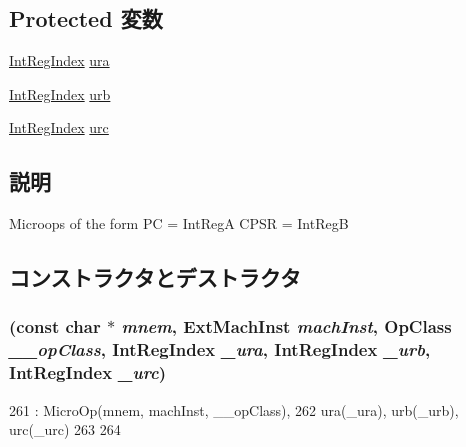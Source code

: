 \subsection*{Protected 変数}
\begin{DoxyCompactItemize}
\item 
\hyperlink{namespaceArmISA_ae64680ba9fb526106829d6bf92fc791b}{IntRegIndex} \hyperlink{classArmISA_1_1MicroSetPCCPSR_a605d05e28dce4515bfd33f74e709f29d}{ura}
\item 
\hyperlink{namespaceArmISA_ae64680ba9fb526106829d6bf92fc791b}{IntRegIndex} \hyperlink{classArmISA_1_1MicroSetPCCPSR_aa5ea75563934f5379a9abef2877e781c}{urb}
\item 
\hyperlink{namespaceArmISA_ae64680ba9fb526106829d6bf92fc791b}{IntRegIndex} \hyperlink{classArmISA_1_1MicroSetPCCPSR_a86973ec62735a43f3925953a6b8afc99}{urc}
\end{DoxyCompactItemize}


\subsection{説明}
Microops of the form PC = IntRegA CPSR = IntRegB 

\subsection{コンストラクタとデストラクタ}
\hypertarget{classArmISA_1_1MicroSetPCCPSR_a79e8561be37a7d8c1c93a1f3cea51dfb}{
\subsubsection[{MicroSetPCCPSR}]{ (const char $\ast$ {\em mnem}, \/  {\bf ExtMachInst} {\em machInst}, \/  OpClass {\em \_\-\_\-opClass}, \/  {\bf IntRegIndex} {\em \_\-ura}, \/  {\bf IntRegIndex} {\em \_\-urb}, \/  {\bf IntRegIndex} {\em \_\-urc})}}
\label{classArmISA_1_1MicroSetPCCPSR_a79e8561be37a7d8c1c93a1f3cea51dfb}



\begin{DoxyCode}
261         : MicroOp(mnem, machInst, __opClass),
262           ura(_ura), urb(_urb), urc(_urc)
263     {
264     }
\end{DoxyCode}


